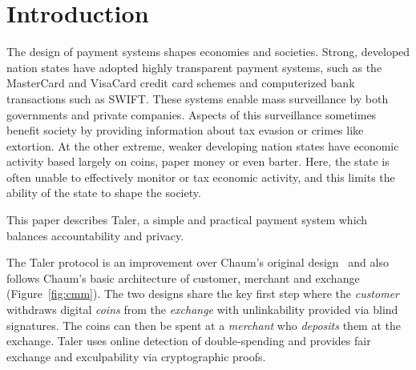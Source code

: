 \documentclass[sigconf, authordraft]{acmart}
\begin{document}



\maketitle

\section{Introduction}

The design of payment systems shapes economies and societies.  Strong,
developed nation states have adopted highly transparent payment systems,
such as the MasterCard and VisaCard credit card schemes and computerized
bank transactions such as SWIFT.  These systems enable mass surveillance
by both governments and private companies.  Aspects of this surveillance
sometimes benefit society by providing information about tax evasion or
crimes like extortion.
%
%
At the other extreme, weaker developing nation states have economic
activity based largely on coins, paper money or even barter.  Here,
the state is often unable to effectively monitor or tax economic
activity, and this limits the ability of the state to shape the
society.
%
%

This paper describes Taler, a simple and practical payment system
which balances accountability and privacy.

The Taler protocol is an improvement over Chaum's original
design~\cite{chaum1983blind} and also follows Chaum's basic
architecture of customer, merchant and exchange
(Figure~\ref{fig:cmm}).  The two designs share the key first step
where the {\em customer} withdraws digital {\em coins} from the {\em
  exchange} with unlinkability provided via blind signatures.  The
coins can then be spent at a {\em merchant} who {\em deposits} them at
the exchange.  Taler uses online detection of double-spending and
provides fair exchange and exculpability via cryptographic proofs.
\end{document}
